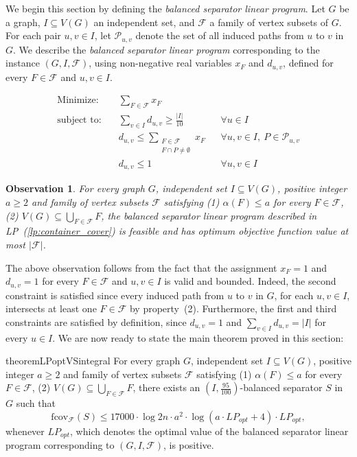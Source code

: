\documentclass[11pt]{amsart}
\newtheorem{observation}[theorem]{Observation}
\newcommand{\lpopt}{LP_{opt}}
\begin{document}
We begin this section by defining the \emph{balanced separator linear program}. Let $G$ be a graph, $I \subseteq V(G)$ an independent set, and $\mathcal{F}$ a family of vertex subsets of $G$. For each pair $u, v \in I$, let $\mathcal{P}_{u,v}$ denote the set of all induced paths from $u$ to $v$ in $G$. We describe the \emph{balanced separator linear program} corresponding to the instance $(G, I, \mathcal{F})$, using non-negative real variables $x_F$ and $d_{u,v}$, defined for every $F \in \mathcal{F}$ and $u, v \in I$.

\begin{align}\label{lp:container_cover}
    \text{Minimize:} \quad & \sum_{F \in \mathcal{F}} x_F \\
    \nonumber
    \text{subject to:} \quad 
    & \sum_{v \in I} d_{u,v} \geq \frac{|I|}{10} && \forall u \in I \\
    \nonumber
    & d_{u,v} \leq \sum_{\substack{F \in \mathcal{F} \\ F \cap P \neq \emptyset}} x_F && \forall u,v \in I,\ P \in \mathcal{P}_{u,v} \\
    \nonumber
    & d_{u,v} \leq 1 && \forall u,v \in I
\end{align}

\begin{observation}\label{obs:lp_is_feasible}
    For every graph $G$, independent set $I \subseteq V(G)$, positive integer $a\geq 2$ and family of vertex subsets $\mathcal{F}$ satisfying (1) $\alpha(F) \leq a$ for every $F\in\mathcal{F}$, (2) $V(G)\subseteq \bigcup_{F\in\mathcal{F}}F$, the balanced separator linear program described in LP~(\ref{lp:container_cover}) is feasible and has optimum objective function value at most $|\mathcal{F}|$.
\end{observation}

The above observation follows from the fact that the assignment $x_F = 1$ and $d_{u,v} = 1$ for every $F\in \mathcal{F}$ and $u,v\in I$ is valid and bounded. Indeed, the second constraint is satisfied since every induced path from $u$ to $v$ in $G$, for each $u,v\in I$, intersects at least one $F\in \mathcal{F}$ by property~(2). Furthermore, the first and third constraints are satisfied by definition, since $d_{u,v} = 1$ and $\sum_{v \in I} d_{u,v} = |I|$ for every $u\in I$.
% 
We are now ready to state the main theorem proved in this section:

\begin{restatable}{theorem}{LPoptVSintegral}
\label{thm:balanced_separator_rounding}
For every graph $G$, independent set $I \subseteq V(G)$, positive integer $a\geq 2$ and family of vertex subsets $\mathcal{F}$ satisfying (1) $\alpha(F) \leq a$ for every $F\in\mathcal{F}$, (2) $V(G)\subseteq \bigcup_{F\in\mathcal{F}}F$, there exists an $(I, \frac{95}{100})$-balanced separator $S$ in $G$ such that
$$
\mathrm{fcov}_{\mathcal{F}}(S) \leq 17000 \cdot \log 2n \cdot a^2 \cdot \log(a \cdot \lpopt + 4) \cdot \lpopt,
$$
whenever $\lpopt$, which denotes the optimal value of the balanced separator linear program corresponding to $(G, I, \mathcal{F})$, is positive.
\end{restatable}
\end{document}
